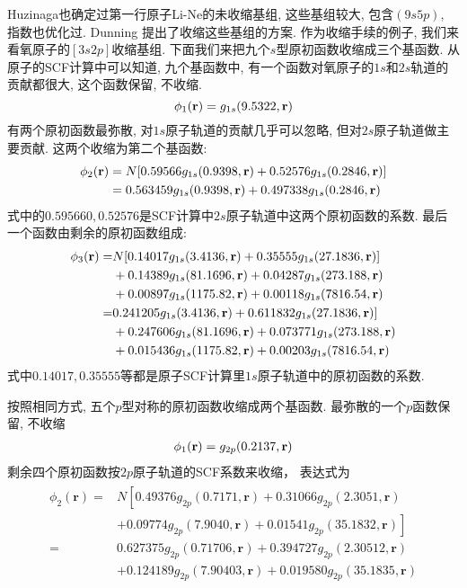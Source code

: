 Huzinaga也确定过第一行原子Li-Ne的未收缩基组, 这些基组较大, 包含$(9s5p)$, 指数也优化过. 
Dunning 提出了收缩这些基组的方案. 作为收缩手续的例子, 我们来看氧原子的$[3s2p]$收缩基组. 
下面我们来把九个$s$型原初函数收缩成三个基函数. 
从原子的SCF计算中可以知道, 九个基函数中, 有一个函数对氧原子的$1s$和$2s$轨道的贡献都很大, 这个函数保留, 不收缩.
\begin{equation}
	\label{3.290}
	\phi_1(\mathbf{r})=g_{1s}(9.5322,\mathbf{r})
\end{equation} 
有两个原初函数最弥散, 
对$1s$原子轨道的贡献几乎可以忽略, 
但对$2s$原子轨道做主要贡献. 
这两个收缩为第二个基函数:
\begin{align}
	\label{3.291}
	\phi_2(\mathbf{r}) & = N[0.59566g_{1s}(0.9398,\mathbf{r}) + 0.52576 g_{1s}(0.2846,\mathbf{r})]\notag\\
	& = 0.563459 g_{1s}(0.9398,\mathbf{r}) + 0.497338 g_{1s}(0.2846,\mathbf{r})
\end{align}
式中的$0.595660,0.52576$是SCF计算中$2s$原子轨道中这两个原初函数的系数. 
最后一个函数由剩余的原初函数组成:
\begin{align}
	\phi_3(\mathbf{r}) = & N[0.14017g_{1s}(3.4136,\mathbf{r}) + 0.35555g_{1s}(27.1836,\mathbf{r})] \notag    \\
	& + 0.14389g_{1s}(81.1696,\mathbf{r}) + 0.04287 g_{1s}(273.188,\mathbf{r}) \notag   \\
	& + 0.00897g_{1s}(1175.82,\mathbf{r}) + 0.00118g_{1s}(7816.54,\mathbf{r}) \notag    \\
	= & 0.241205g_{1s}(3.4136,\mathbf{r}) + 0.611832g_{1s}(27.1836,\mathbf{r})] \notag    \\
	& + 0.247606g_{1s}(81.1696,\mathbf{r}) + 0.073771 g_{1s}(273.188,\mathbf{r}) \notag \\
	& + 0.015436g_{1s}(1175.82,\mathbf{r}) + 0.00203g_{1s}(7816.54,\mathbf{r})
\end{align}
式中$0.14017, 0.35555$等都是原子SCF计算里$1s$原子轨道中的原初函数的系数.


按照相同方式, 
五个$p$型对称的原初函数收缩成两个基函数. 
最弥散的一个$p$函数保留, 
不收缩
\begin{align}
	\phi_1(\mathbf{r}) = g_{2p}(0.2137,\mathbf{r})
\end{align}
剩余四个原初函数按$2p$原子轨道的SCF系数来收缩，
表达式为
\begin{align}
	\begin{aligned}
		\phi_{2}(\mathbf{r})= & N\left[0.49376 g_{2 p}(0.7171, \mathbf{r})+0.31066 g_{2 p}(2.3051, \mathbf{r})\right.  \\
		& \left.+0.09774 g_{2 p}(7.9040, \mathbf{r})+0.01541 g_{2 p}(35.1832, \mathbf{r})\right] \\
		= & 0.627375 g_{2 p}(0.71706, \mathbf{r})+0.394727 g_{2 p}(2.30512, \mathbf{r})            \\
		& +0.124189 g_{2 p}(7.90403, \mathbf{r})+0.019580 g_{2 p}(35.1835, \mathbf{r})
	\end{aligned}
\end{align}


